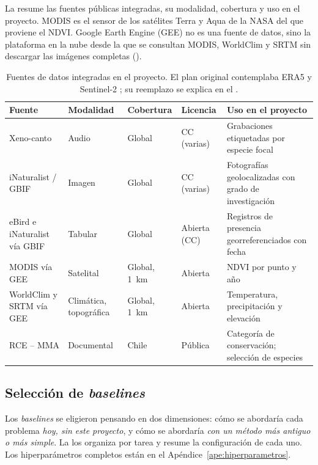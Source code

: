 La  resume las fuentes públicas integradas, su
modalidad, cobertura y uso en el proyecto. MODIS es el sensor de los
satélites Terra y Aqua de la NASA del que proviene el NDVI. Google Earth
Engine (GEE) no es una fuente de datos, sino la plataforma en la nube desde
la que se consultan MODIS, WorldClim y SRTM sin descargar las imágenes
completas ().

\begin{table}[!htb]
  \centering\footnotesize
  \caption{Fuentes de datos integradas en el proyecto. El plan original
  contemplaba ERA5 \citep{hersbach2020era5} y Sentinel-2
  \citep{drusch2012sentinel2}; su reemplazo se explica en el
  .}
  \label{tab:fuentes}
  \begin{tabularx}{\textwidth}{@{}>{\raggedright\arraybackslash\hsize=1.2\hsize}X l l l >{\raggedright\arraybackslash\hsize=0.8\hsize}X@{}}
    \toprule
    Fuente & Modalidad & Cobertura & Licencia & Uso en el proyecto \\
    \midrule
    Xeno-canto \citep{vellinga2015xenocanto} & Audio & Global & CC (varias) & Grabaciones etiquetadas por especie focal \\
    iNaturalist / GBIF \citep{vanhorn2018inaturalist} & Imagen & Global & CC (varias) & Fotografías geolocalizadas con grado de investigación \\
    eBird e iNaturalist vía GBIF \citep{sullivan2014ebird} & Tabular & Global & Abierta (CC) & Registros de presencia georreferenciados con fecha \\
    MODIS vía GEE \citep{didan2021mod13a2, gorelick2017gee} & Satelital & Global, \SI{1}{\kilo\metre} & Abierta & NDVI por punto y año \\
    WorldClim y SRTM vía GEE \citep{hijmans2005worldclim, farr2007srtm} & Climática, topográfica & Global, \SI{1}{\kilo\metre} & Abierta & Temperatura, precipitación y elevación \\
    RCE -- MMA \citep{mma2026rce} & Documental & Chile & Pública & Categoría de conservación; selección de especies \\
    \bottomrule
  \end{tabularx}
\end{table}

\subsection{Selección de \textit{baselines}}

Los \textit{baselines} se eligieron pensando en dos dimensiones: cómo se
abordaría cada problema \emph{hoy, sin este proyecto}, y cómo se abordaría
\emph{con un método más antiguo o más simple}. La 
los organiza por tarea y resume la configuración de cada uno. Los
hiperparámetros completos están en el Apéndice~\ref{ape:hiperparametros}.

